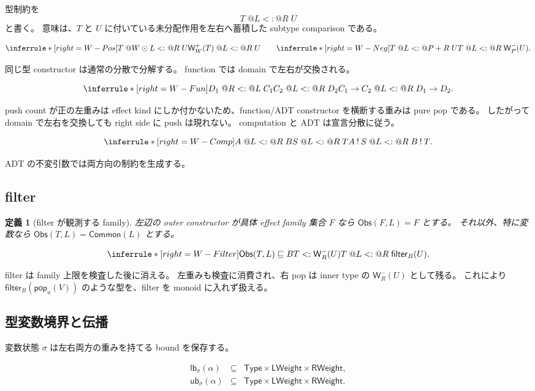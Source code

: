 \documentclass[uplatex,dvipdfmx,a4paper,10.5pt]{jsarticle}
\makeatletter
\theoremstyle{jpplain}
\newtheorem{definition}{定義}[section]
\newcommand{\lb}{\mathsf{lb}}
\newcommand{\ub}{\mathsf{ub}}
\newcommand{\Common}{\mathsf{Common}}
\newcommand{\Obs}{\mathsf{Obs}}
\newcommand{\Filter}[2]{\mathsf{filter}_{#1}(#2)}
\newcommand{\PWeight}[2]{\mathsf{W}^{+}_{#1}(#2)}
\newcommand{\NWeight}[2]{\mathsf{W}^{-}_{#1}(#2)}
\newcommand{\popop}[1]{\mathsf{pop}_{#1}}
\newcommand{\comp}{\mathbin{!}}
\newcommand{\wsub}[4]{#1\;@#2\mathrel{<:}@#3\;#4}
\newcommand{\subty}[2]{#1\mathrel{<:}#2}
\newcommand{\fsub}[2]{#1\mathrel{\sqsubseteq}#2}
\makeatother
\begin{document}
型制約を
\[
  \wsub{T}{L}{R}{U}
\]
と書く。
意味は、$T$ と $U$ に付いている未分配作用を左右へ蓄積した subtype comparison である。

\[
\inferrule*[right=W-Pos]
 {\wsub{T}{W\odot L}{R}{U}}
 {\wsub{\PWeight{W}{T}}{L}{R}{U}}
\qquad
\inferrule*[right=W-Neg]
 {\wsub{T}{L}{P+R}{U}}
 {\wsub{T}{L}{R}{\NWeight{P}{U}}}.
\]

同じ型 constructor は通常の分散で分解する。
function では domain で左右が交換される。

\[
\inferrule*[right=W-Fun]
 {\wsub{D_1}{R}{L}{C_1}\\
  \wsub{C_2}{L}{R}{D_2}}
 {\wsub{C_1\to C_2}{L}{R}{D_1\to D_2}}.
\]

push count が正の左重みは effect kind にしか付かないため、function/ADT constructor を横断する重みは pure pop である。
したがって domain で左右を交換しても right side に push は現れない。
computation と ADT は宣言分散に従う。

\[
\inferrule*[right=W-Comp]
 {\wsub{A}{L}{R}{B}\\\wsub{S}{L}{R}{T}}
 {\wsub{A\comp S}{L}{R}{B\comp T}}.
\]

ADT の不変引数では両方向の制約を生成する。

\subsection{filter}

\begin{definition}[filter が観測する family]
左辺の outer constructor が具体 effect family 集合 $F$ なら
$\Obs(F,L)=F$ とする。
それ以外、特に変数なら
$\Obs(T,L)=\Common(L)$ とする。
\end{definition}

\[
\inferrule*[right=W-Filter]
 {\fsub{\Obs(T,L)}{B}\\
  \subty{T}{\NWeight{R}{U}}}
 {\wsub{T}{L}{R}{\Filter{B}{U}}}.
\]

filter は family 上限を検査した後に消える。
左重みも検査に消費され、右 pop は inner type の $\NWeight{R}{U}$ として残る。
これにより $\Filter{B}{\popop{u}(V)}$ のような型を、filter を monoid に入れず扱える。

\subsection{型変数境界と伝播}

変数状態 $\sigma$ は左右両方の重みを持てる bound を保存する。

\[
\begin{array}{rcl}
\lb_\sigma(\alpha)&\subseteq&\mathsf{Type}\times\mathsf{LWeight}\times\mathsf{RWeight},\\
\ub_\sigma(\alpha)&\subseteq&\mathsf{Type}\times\mathsf{LWeight}\times\mathsf{RWeight}.
\end{array}
\]
\end{document}
